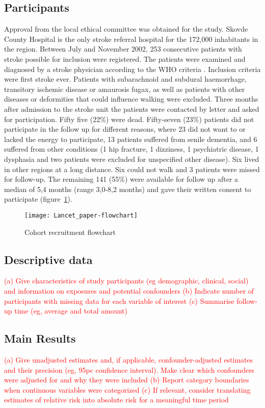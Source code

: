 \documentclass[a4paper,12pt]{article}
\begin{document}
\subsection{Participants}
Approval from the local ethical committee was obtained for the study. 
Skovde County Hospital is the only stroke referral hospital for the 172,000 inhabitants in the region. Between July and November 2002, 253 consecutive patients with stroke possible for inclusion were registered. The patients were examined and diagnosed by a stroke physician according to the WHO criteria \cite{Thorvaldsen1995}. Inclusion criteria were first stroke ever. Patients with subarachnoid and subdural haemorrhage, transitory ischemic disease or amaurosis fugax, as well as patients with other diseases or deformities that could influence walking were excluded. 
Three months after admission to the stroke unit the patients were contacted by letter and asked for participation. Fifty five (22\%) were dead. Fifty-seven (23\%) patients did not participate in the follow up for different reasons, where 23 did not want to or lacked the energy to participate, 13 patients suffered from senile dementia, and 6 suffered from other conditions (1 hip fracture, 1 dizziness, 1 psychiatric disease, 1 dysphasia and two patients were excluded for unspecified other disease). Six lived in other regions at a long distance. Six could not walk and 3 patients were missed for follow-up.
The remaining 141 (55\%) were available for follow up after a median of 5,4 months (range 3,0-8,2 months) and gave their written consent to participate (figure~\ref{fig:flowchart}). 
\begin{figure}[h]
\texttt{[image: Lancet\_paper-flowchart]}
\caption{Cohort recruitment flowchart}
\label{fig:flowchart}
\end{figure}
\subsection{Descriptive data} \textcolor{red}{(a) Give characteristics of study participants 
(eg demographic, clinical, social) and information on exposures and potential confounders
(b) Indicate number of participants with missing data for each variable of interest
(c) Summarise follow-up time (eg, average and total amount)}

\subsection{Main Results}\textcolor{red}{
(a) Give unadjusted estimates and, if applicable, confounder-adjusted estimates and
their precision (eg, 95pc confidence interval). Make clear which confounders were
adjusted for and why they were included
(b) Report category boundaries when continuous variables were categorized
(c) If relevant, consider translating estimates of relative risk into absolute risk for a
meaningful time period}
\end{document}
